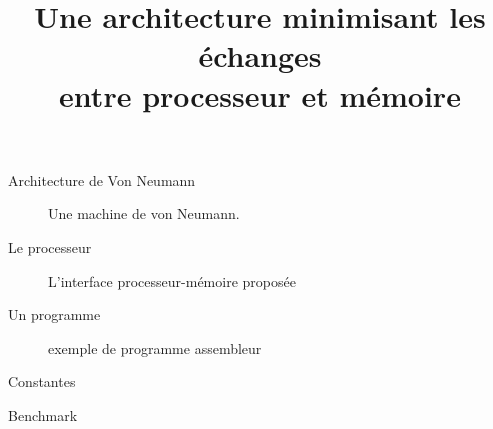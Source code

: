 \documentclass[slidetop,11pt]{beamer}
\title{Une architecture minimisant les échanges\\ entre processeur et mémoire}
\date{}
\begin{document}
\frame{\titlepage}


\begin{frame}{Architecture de Von Neumann}
  \begin{figure}[b]
    \begin{center}
      \figVonNeumann
    \end{center}
    \caption{Une machine de von Neumann.}
    \label{fig:mvn} 
  \end{figure}
\end{frame}

\begin{frame}{Le processeur}
  \begin{figure}[b]
    \begin{center}
      \proco
    \end{center}
    \caption{L'interface processeur-mémoire proposée}
    \label{fig:overview}
  \end{figure}
\end{frame}

\begin{frame}{Un programme}
  \begin{figure}
    {\tiny \tt \progex}
    \caption{exemple de programme assembleur}
  \end{figure}
\end{frame}

\begin{frame}{Constantes}
  \begin{table}[t]
  \centering
  \caption{Encodage \emph{prefix-free} des différentes constantes  \label{tab:constantes}}
  {\tiny \prefree}
\end{table}
\end{frame}

\begin{frame}{Benchmark}
  \begin{table}
    {\tiny
  \benchmark}
  \caption{Nombre de bits échangés par benchmark. BPI: bits par instruction (moyen). Encodage des opcodes: I initial, H Huffman. Les colonne à partir de \emph{data R} comptent  les bits qui passent sur \texttt{D} à l'exécution des instructions de lecture, d'écriture, d'accès aux compteurs, et de sauts/call  respectivement. }
  \label{tab:bitcounts}
\end{table}

\end{frame}

%   
%   
\end{document}

